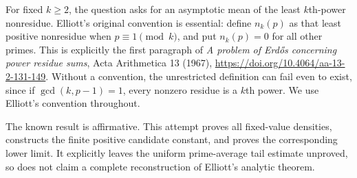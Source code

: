 For fixed $k\ge2$, the question asks for an asymptotic mean of the least $k$th-power nonresidue. Elliott's original convention is essential: define $n_k(p)$ as that least positive nonresidue when $p\equiv1\pmod k$, and put $n_k(p)=0$ for all other primes. This is explicitly the first paragraph of \emph{A problem of Erd\H{o}s concerning power residue sums}, Acta Arithmetica 13 (1967), \url{https://doi.org/10.4064/aa-13-2-131-149}. Without a convention, the unrestricted definition can fail even to exist, since if $\gcd(k,p-1)=1$, every nonzero residue is a $k$th power. We use Elliott's convention throughout.

The known result is affirmative. This attempt proves all fixed-value densities, constructs the finite positive candidate constant, and proves the corresponding lower limit. It explicitly leaves the uniform prime-average tail estimate unproved, so does not claim a complete reconstruction of Elliott's analytic theorem.

